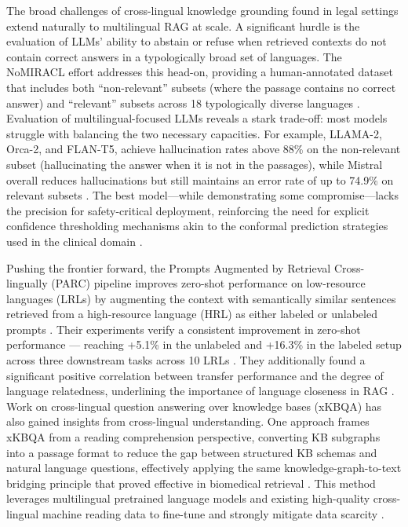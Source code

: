 \documentclass[11pt]{article}
\begin{document}
The broad challenges of cross-lingual knowledge grounding found in legal settings extend naturally to multilingual RAG at scale. A significant hurdle is the evaluation of LLMs' ability to abstain or refuse when retrieved contexts do not contain correct answers in a typologically broad set of languages. The NoMIRACL effort addresses this head-on, providing a human-annotated dataset that includes both ``non-relevant'' subsets (where the passage contains no correct answer) and ``relevant'' subsets across 18 typologically diverse languages \cite{ref125}. Evaluation of multilingual-focused LLMs reveals a stark trade-off: most models struggle with balancing the two necessary capacities. For example, LLAMA-2, Orca-2, and FLAN-T5, achieve hallucination rates above 88\% on the non-relevant subset (hallucinating the answer when it is not in the passages), while Mistral overall reduces hallucinations but still maintains an error rate of up to 74.9\% on relevant subsets \cite{ref125}. The best model---while demonstrating some compromise---lacks the precision for safety-critical deployment, reinforcing the need for explicit confidence thresholding mechanisms akin to the conformal prediction strategies used in the clinical domain \cite{ref125}.

Pushing the frontier forward, the Prompts Augmented by Retrieval Cross-lingually (PARC) pipeline improves zero-shot performance on low-resource languages (LRLs) by augmenting the context with semantically similar sentences retrieved from a high-resource language (HRL) as either labeled or unlabeled prompts \cite{ref187}. Their experiments verify a consistent improvement in zero-shot performance --- reaching +5.1\% in the unlabeled and +16.3\% in the labeled setup across three downstream tasks across 10 LRLs \cite{ref187}. They additionally found a significant positive correlation between transfer performance and the degree of language relatedness, underlining the importance of language closeness in RAG \cite{ref187}. Work on cross-lingual question answering over knowledge bases (xKBQA) has also gained insights from cross-lingual understanding. One approach frames xKBQA from a reading comprehension perspective, converting KB subgraphs into a passage format to reduce the gap between structured KB schemas and natural language questions, effectively applying the same knowledge-graph-to-text bridging principle that proved effective in biomedical retrieval \cite{ref188}. This method leverages multilingual pretrained language models and existing high-quality cross-lingual machine reading data to fine-tune and strongly mitigate data scarcity \cite{ref188}.
\end{document}

